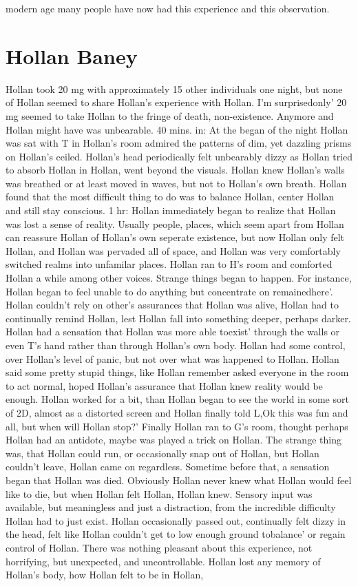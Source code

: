 \documentclass[12pt]{book}
\begin{document}
modern age many people have now had this experience and this observation.



\chapter{Hollan Baney}

Hollan took 20 mg with approximately 15 other individuals one night, but none of Hollan seemed to share Hollan's experience with Hollan. I'm surprisedonly' 20 mg seemed to take Hollan to the fringe of death, non-existence. Anymore and Hollan might have was unbearable. 40 mins. in: At the began of the night Hollan was sat with T in Hollan's room admired the patterns of dim, yet dazzling prisms on Hollan's ceiled. Hollan's head periodically felt unbearably dizzy as Hollan tried to absorb Hollan in Hollan, went beyond the visuals. Hollan knew Hollan's walls was breathed or at least moved in waves, but not to Hollan's own breath. Hollan found that the most difficult thing to do was to balance Hollan, center Hollan and still stay conscious. 1 hr: Hollan immediately began to realize that Hollan was lost a sense of reality. Usually people, places, which seem apart from Hollan can reassure Hollan of Hollan's own seperate existence, but now Hollan only felt Hollan, and Hollan was pervaded all of space, and Hollan was very comfortably switched realms into unfamilar places. Hollan ran to H's room and comforted Hollan a while among other voices. Strange things began to happen. For instance, Hollan began to feel unable to do anything but concentrate on remainedhere'. Hollan couldn't rely on other's assurances that Hollan was alive, Hollan had to continually remind Hollan, lest Hollan fall into something deeper, perhaps darker. Hollan had a sensation that Hollan was more able toexist' through the walls or even T's hand rather than through Hollan's own body. Hollan had some control, over Hollan's level of panic, but not over what was happened to Hollan. Hollan said some pretty stupid things, like Hollan remember asked everyone in the room to act normal, hoped Hollan's assurance that Hollan knew reality would be enough. Hollan worked for a bit, than Hollan began to see the world in some sort of 2D, almost as a distorted screen and Hollan finally told L,Ok this was fun and all, but when will Hollan stop?' Finally Hollan ran to G's room, thought perhaps Hollan had an antidote, maybe was played a trick on Hollan. The strange thing was, that Hollan could run, or occasionally snap out of Hollan, but Hollan couldn't leave, Hollan came on regardless. Sometime before that, a sensation began that Hollan was died. Obviously Hollan never knew what Hollan would feel like to die, but when Hollan felt Hollan, Hollan knew. Sensory input was available, but meaningless and just a distraction, from the incredible difficulty Hollan had to just exist. Hollan occasionally passed out, continually felt dizzy in the head, felt like Hollan couldn't get to low enough ground tobalance' or regain control of Hollan. There was nothing pleasant about this experience, not horrifying, but unexpected, and uncontrollable. Hollan lost any memory of Hollan's body, how Hollan felt to be in Hollan, 
\end{document}
